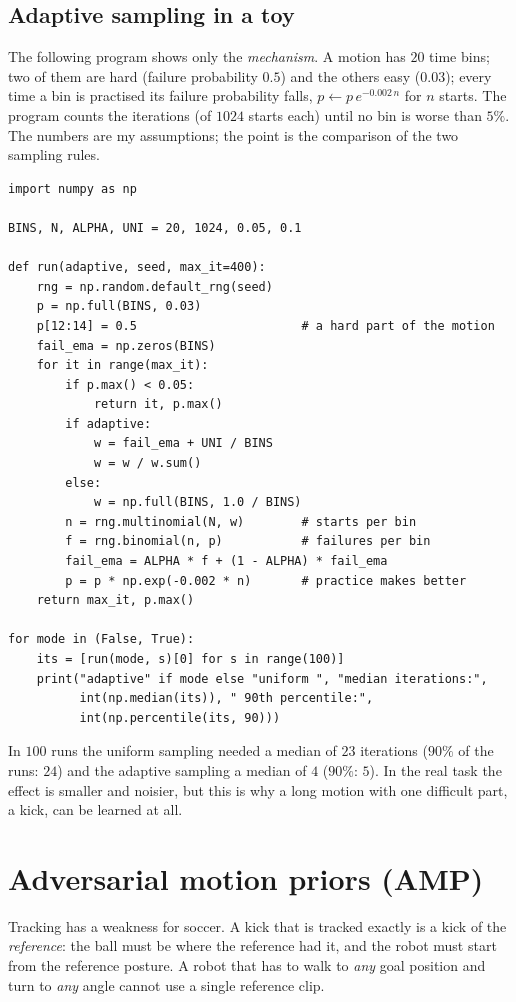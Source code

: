 \subsection*{Adaptive sampling in a toy}
The following program shows only the \emph{mechanism}. A motion has $20$ time bins; two of them are hard (failure probability $0.5$) and the others easy ($0.03$); every time a bin is practised its failure probability falls, $p\leftarrow p\,e^{-0.002\,n}$ for $n$ starts. The program counts the iterations (of $1024$ starts each) until no bin is worse than $5\%$. The numbers are my assumptions; the point is the comparison of the two sampling rules.
\begin{verbatim}
import numpy as np

BINS, N, ALPHA, UNI = 20, 1024, 0.05, 0.1

def run(adaptive, seed, max_it=400):
    rng = np.random.default_rng(seed)
    p = np.full(BINS, 0.03)
    p[12:14] = 0.5                       # a hard part of the motion
    fail_ema = np.zeros(BINS)
    for it in range(max_it):
        if p.max() < 0.05:
            return it, p.max()
        if adaptive:
            w = fail_ema + UNI / BINS
            w = w / w.sum()
        else:
            w = np.full(BINS, 1.0 / BINS)
        n = rng.multinomial(N, w)        # starts per bin
        f = rng.binomial(n, p)           # failures per bin
        fail_ema = ALPHA * f + (1 - ALPHA) * fail_ema
        p = p * np.exp(-0.002 * n)       # practice makes better
    return max_it, p.max()

for mode in (False, True):
    its = [run(mode, s)[0] for s in range(100)]
    print("adaptive" if mode else "uniform ", "median iterations:",
          int(np.median(its)), " 90th percentile:",
          int(np.percentile(its, 90)))
\end{verbatim}
In $100$ runs the uniform sampling needed a median of $23$ iterations ($90\%$ of the runs: $24$) and the adaptive sampling a median of $4$ ($90\%$: $5$). In the real task the effect is smaller and noisier, but this is why a long motion with one difficult part, a kick, can be learned at all.

\section*{Adversarial motion priors (AMP)}
Tracking has a weakness for soccer. A kick that is tracked exactly is a kick of the \emph{reference}: the ball must be where the reference had it, and the robot must start from the reference posture. A robot that has to walk to \emph{any} goal position and turn to \emph{any} angle cannot use a single reference clip.

